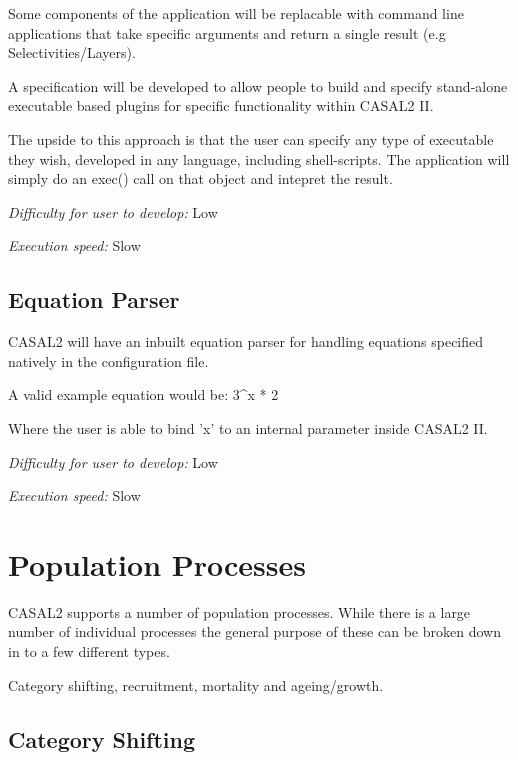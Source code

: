 \documentclass[a4paper,11pt,twoside,pdftex,draft]{article}
\begin{document}
Some components of the application will be replacable with command line
applications that take specific arguments and return a single result
(e.g Selectivities/Layers).

A specification will be developed to allow people to build and specify
stand-alone executable based plugins for specific functionality within
CASAL2 II.

The upside to this approach is that the user can specify any type of
executable they wish, developed in any language, including
shell-scripts. The application will simply do an exec() call on that
object and intepret the result.

\emph{Difficulty for user to develop:} Low

\emph{Execution speed:} Slow

\hypertarget{equation-parser}{%
\subsection{Equation Parser}\label{equation-parser}}

CASAL2 will have an inbuilt equation parser for handling equations
specified natively in the configuration file.

A valid example equation would be: 3\^{}x * 2

Where the user is able to bind 'x' to an internal parameter inside
CASAL2 II.

\emph{Difficulty for user to develop:} Low

\emph{Execution speed:} Slow

\hypertarget{section-1}{%
\section{\texorpdfstring{\hfill\break
}{ }}\label{section-1}}

\hypertarget{population-processes}{%
\section{Population Processes}\label{population-processes}}

CASAL2 supports a number of population processes. While there is a large
number of individual processes the general purpose of these can be
broken down in to a few different types.

Category shifting, recruitment, mortality and ageing/growth.

\hypertarget{category-shifting}{%
\subsection{Category Shifting}\label{category-shifting}}
\end{document}
